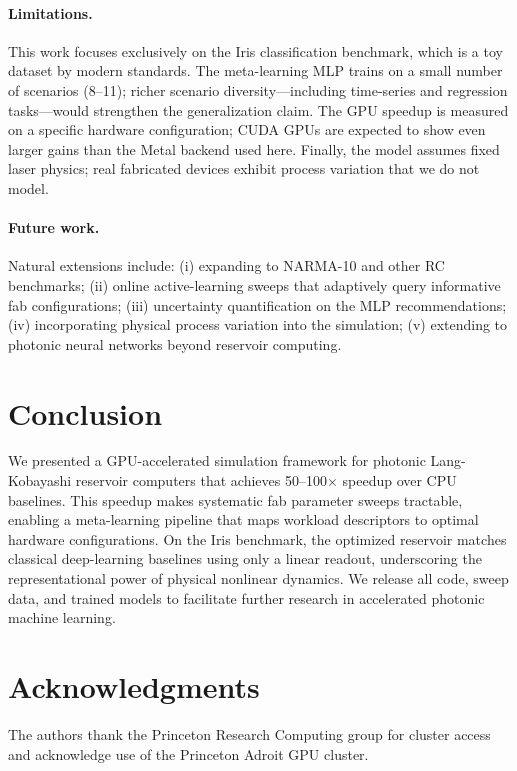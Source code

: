 \documentclass{article}
\begin{document}
\paragraph{Limitations.}
This work focuses exclusively on the Iris classification benchmark, which
is a toy dataset by modern standards.
The meta-learning MLP trains on a small number of scenarios (8--11);
richer scenario diversity---including time-series and regression tasks---would
strengthen the generalization claim.
The GPU speedup is measured on a specific hardware configuration; CUDA GPUs
are expected to show even larger gains than the Metal backend used here.
Finally, the model assumes fixed laser physics; real fabricated devices exhibit
process variation that we do not model.

\paragraph{Future work.}
Natural extensions include: (i) expanding to NARMA-10 and other RC benchmarks;
(ii) online active-learning sweeps that adaptively query informative fab
configurations; (iii) uncertainty quantification on the MLP recommendations;
(iv) incorporating physical process variation into the simulation;
(v) extending to photonic neural networks beyond reservoir computing.

\section{Conclusion}
\label{sec:conclusion}

We presented a GPU-accelerated simulation framework for photonic Lang-Kobayashi
reservoir computers that achieves 50--100$\times$ speedup over CPU baselines.
This speedup makes systematic fab parameter sweeps tractable, enabling a
meta-learning pipeline that maps workload descriptors to optimal hardware
configurations.
On the Iris benchmark, the optimized reservoir matches classical deep-learning
baselines using only a linear readout, underscoring the representational power
of physical nonlinear dynamics.
We release all code, sweep data, and trained models to facilitate further
research in accelerated photonic machine learning.

\section*{Acknowledgments}
The authors thank the Princeton Research Computing group for cluster access
and acknowledge use of the Princeton Adroit GPU cluster.
\end{document}
